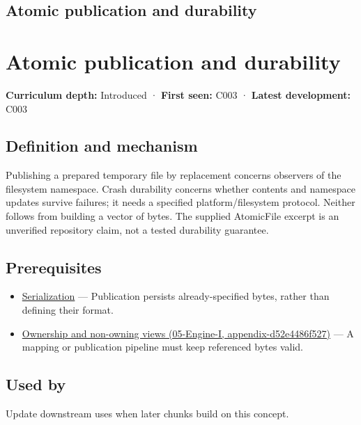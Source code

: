 \hypertarget{appendix-e89a8f290ef5}{}
\section*{Atomic publication and durability}
\chapter{Atomic publication and durability}\label{appendix-e89a8f290ef5-atomic-publication-and-durability}

\textbf{Curriculum depth:} Introduced · \textbf{First seen:} C003 · \textbf{Latest development:} C003

\section{Definition and mechanism}\label{appendix-e89a8f290ef5-definition-and-mechanism}

Publishing a prepared temporary file by replacement concerns observers of the filesystem namespace. Crash durability concerns whether contents and namespace updates survive failures; it needs a specified platform/filesystem protocol. Neither follows from building a vector of bytes. The supplied AtomicFile excerpt is an unverified repository claim, not a tested durability guarantee.

\section{Prerequisites}\label{appendix-e89a8f290ef5-prerequisites}

\begin{itemize}
\tightlist
\item
  \hyperref[appendix-91d09ebed979]{Serialization} --- Publication persists already-specified bytes, rather than defining their format.
\item
  \href{../05-Engine-I/main.pdf\#nameddest=appendix-d52e4486f527}{Ownership and non-owning views (05-Engine-I, appendix-d52e4486f527)} --- A mapping or publication pipeline must keep referenced bytes valid.
\end{itemize}

\section{Used by}\label{appendix-e89a8f290ef5-used-by}

Update downstream uses when later chunks build on this concept.

